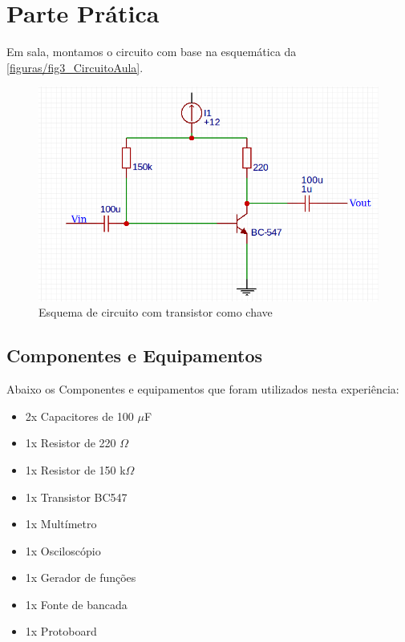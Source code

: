 
\chapter[Parte Prática]{Parte Prática}
Em sala, montamos o circuito com base na esquemática da \autoref{figuras/fig3_CircuitoAula}.

\begin{figure}[htb]
  \caption{\label{figuras/fig3_CircuitoAula}Esquema de circuito com transistor como chave}
  \includegraphics[scale=0.50]{figuras/fig3_CircuitoAula}
  \centering
\end{figure}

\section[Componentes e Equipamentos]{Componentes e Equipamentos} 

Abaixo os Componentes e equipamentos que foram utilizados nesta experiência:
\begin{itemize}
    \item 2x Capacitores de 100 $\mu$F
    \item 1x Resistor de 220 $\Omega$
    \item 1x Resistor de 150 k$\Omega$
    \item 1x Transistor BC547
    \item 1x Multímetro
    \item 1x Osciloscópio
    \item 1x Gerador de funções
    \item 1x Fonte de bancada
    \item 1x Protoboard
\end{itemize}


